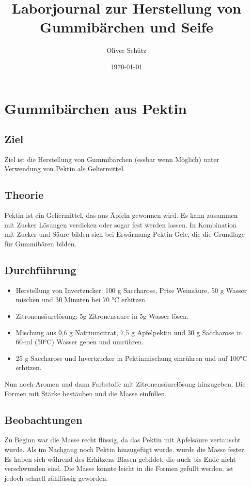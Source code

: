 \documentclass{article}
\title{Laborjournal zur Herstellung von Gummibärchen und Seife}
\author{Oliver Schütz}
\date{\today}
\begin{document}
    \maketitle

    \section{Gummibärchen aus Pektin}

    \subsection{Ziel}
    Ziel ist die Herstellung von Gummibärchen (essbar wenn Möglich) unter Verwendung von Pektin als Geliermittel.

    \subsection{Theorie}
    Pektin ist ein Geliermittel, das aus Äpfeln gewonnen wird.
    Es kann zusammen mit Zucker Lösungen verdicken oder sogar fest werden lassen.
    In Kombination mit Zucker und Säure bilden sich bei Erwärmung Pektin-Gele, die die Grundlage für Gummibären bilden.


    \subsection{Durchführung}

    \begin{itemize}
        \item Herstellung von Invertzucker: 100 g Saccharose, Prise Weinsäure, 50 g Wasser mischen und 30 Minuten bei 70 °C erhitzen.
        \item Zitronensäurelösung: 5g Zitronensaure in 5g Wasser lösen.
        \item Mischung aus 0,6 g Natriumcitrat, 7,5 g Apfelpektin und 30 g Saccharose in 60-ml (50°C) Wasser geben und umrühren.
        \item 25 g Saccharose und Invertzucker in Pektinmischung einrühren und auf 100°C erhitzen.
    \end{itemize}
    Nun noch Aromen und dann Farbstoffe mit Zitronensäurelösung hinzugeben.
    Die Formen mit Stärke bestäuben und die Masse einfüllen.

    \subsection{Beobachtungen}
    Zu Beginn war die Masse recht flüssig, da das Pektin mit Apfelsäure vertauscht wurde.
    Als im Nachgang noch Pektin hinzugefügt wurde, wurde die Masse fester.
    Es haben sich während des Erhitzens Blasen gebildet, die auch bis Ende nicht verschwunden sind.
    Die Masse konnte leicht in die Formen gefüllt werden, ist jedoch schnell zähflüssig geworden.
\end{document}
